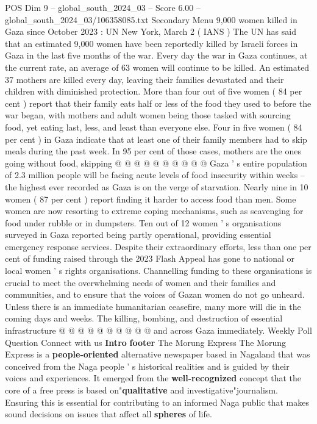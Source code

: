 \begin{textsample}{POS Dim 9 – global\_south\_2024\_03 – Score 6.00 – global\_south\_2024\_03/106358085.txt}  \label{ex:f9_pos_046}
Secondary Menu 9,000 women killed in Gaza since October 2023 : UN New York, March 2 ( IANS ) The UN has said that an estimated 9,000 women have been reportedly killed by Israeli forces in Gaza in the last five months of the war.
Every day the war in Gaza continues, at the current rate, an average of 63 women will continue to be killed.
An estimated 37 mothers are killed every day, leaving their families devastated and their children with diminished protection.
More than four out of five women ( 84 per cent ) report that their family eats half or less of the food they used to before the war began, with mothers and adult women being those tasked with sourcing food, yet eating last, less, and least than everyone else.
Four in five women ( 84 per cent ) in Gaza indicate that at least one of their family members had to skip meals during the past week.
In 95 per cent of those cases, mothers are the ones going without food, skipping @ @ @ @ @ @ @ @ @ @ Gaza ' s entire population of 2.3 million people will be facing acute levels of food insecurity within weeks -- the highest ever recorded as Gaza is on the verge of starvation.
Nearly nine in 10 women ( 87 per cent ) report finding it harder to access food than men.
Some women are now resorting to extreme coping mechanisms, such as scavenging for food under rubble or in dumpsters.
Ten out of 12 women ' s organisations surveyed in Gaza reported being partly operational, providing essential emergency response services.
Despite their extraordinary efforts, less than one per cent of funding raised through the 2023 Flash Appeal has gone to national or local women ' s rights organisations.
Channelling funding to these organisations is crucial to meet the overwhelming needs of women and their families and communities, and to ensure that the voices of Gazan women do not go unheard.
Unless there is an immediate humanitarian ceasefire, many more will die in the coming days and weeks.
The killing, bombing, and destruction of essential infrastructure @ @ @ @ @ @ @ @ @ @ and across Gaza immediately.
Weekly Poll Question Connect with us \textbf{Intro} \textbf{footer} The Morung Express The Morung Express is a \textbf{people-oriented} alternative newspaper based in Nagaland that was conceived from the Naga people ' s historical realities and is guided by their voices and experiences.
It emerged from the \textbf{well-recognized} concept that the core of a free press is based on"\textbf{qualitative} and investigative"journalism.
Ensuring this is essential for contributing to an informed Naga public that makes sound decisions on issues that affect all \textbf{spheres} of life.

\end{textsample}
